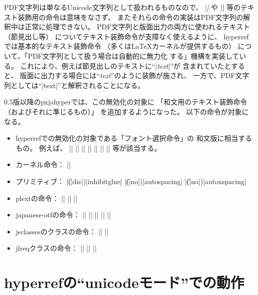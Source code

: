 \documentclass[uplatex,dvipdfmx,a4paper]{jsarticle}
\newcommand{\Pkg}[1]{\textsf{#1}}
\newcommand{\Means}{：\quad}
\begin{document}
PDF文字列は単なるUnicode文字列として扱われるものなので、
|\textit| や |\large| 等のテキスト装飾用の命令は意味をなさず、
またそれらの命令の実装はPDF文字列の解釈中は正常に処理できない。
PDF文字列と版面出力の両方に使われるテキスト（節見出し等）
についてテキスト装飾命令が支障なく使えるように、
\Pkg{hyperref}では基本的なテキスト装飾命令
（多くは{\LaTeX}カーネルが提供するもの）
について、「PDF文字列として扱う場合は自動的に無力化
する」機構を実装している。
これにより、例えば節見出しのテキストに“|\textit{text}|”が
含まれていたとすると、
版面に出力する場合には“\textit{text}”のように装飾が施され、
一方で、PDF文字列としては“|text|”と解釈されることになる。

0.5版以降の\Pkg{pxjahyper}では、この無効化の対象に
「和文用のテキスト装飾命令（およびそれに準じるもの）」
を追加するようになった。
以下の命令が対象になる。

\begin{itemize}
\item \Pkg{hyperref}での無効化の対象である「フォント選択命令」の
  和文版に相当するもの。
  例えば、
  |\textmc| |\gtfamily| |\kanjifamily| |\romanshape|
  |\usekanji| |\useroman| |\userelfont|
  等が該当する。
\item {\pLaTeX}カーネル命令\Means
  |\<|
\item {\pTeX}プリミティブ\Means
  |\|(|dis|)|inhibitglue| |\|(|no|)|autospacing| |\|(|no|)|autoxspacing|
\item \Pkg{plext}の命令\Means
  |\bou| |\kasen| |\rensuji|
\item \Pkg{japanese-otf}の命令\Means
  |\textmg| |\mgfamily| |\ltseries| |\ebseries| |\propshape|
\item \Pkg{jsclasses}のクラスの命令\Means
  |\maybeblue| |\HUGE|
\item \Pkg{jlreq}クラスの命令\Means
  |\jafontsize| |\tatechuyoko| |\jidori| %
\end{itemize}

\section{hyperrefの“unicodeモード”での動作}
\label{sec:Unicode-mode}
\end{document}
